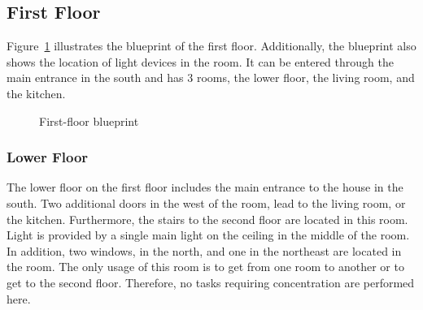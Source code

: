 \documentclass[letterpaper, 11pt]{Proposal}
\def\Fig#1{Figure~\ref{#1}}
\begin{document}
\subsection{First Floor}\label{subsec:04_rooms_frstFloor}
\Fig{fig:04_rooms_frstFloor_blueprint} illustrates the blueprint of 
the first floor.
Additionally, the blueprint also shows the location of light devices in the room.
It can be entered through the main entrance in the south and has 3 rooms, 
the lower floor, the living room, and the kitchen.
\begin{figure}
    \centering
    \caption{First-floor blueprint}
    \label{fig:04_rooms_frstFloor_blueprint}
\end{figure}

\subsubsection{Lower Floor}\label{subsec:04_rooms_lowFloor}
The lower floor on the first floor includes the main entrance to the house in the south.
Two additional doors in the west of the room, 
lead to the living room, or the kitchen.
Furthermore, the stairs to the second floor are located in this room.
Light is provided by a single main light on the ceiling in the middle of the room.
In addition, two windows, in the north, and one in the northeast are located
in the room.
The only usage of this room is to get from one room to another or to 
get to the second floor. 
Therefore, no tasks requiring concentration are performed here.
\end{document}
